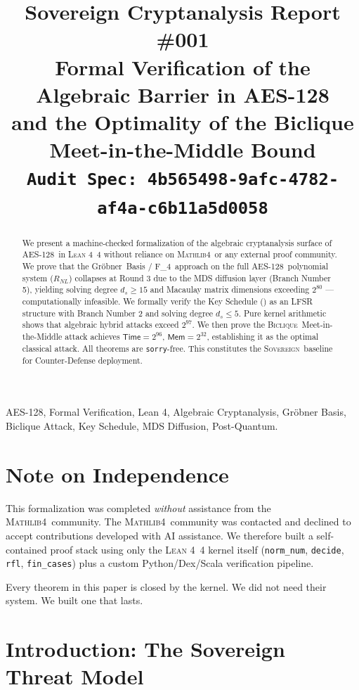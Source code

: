 \documentclass[10pt,conference,compsoc]{IEEEtran}
\title{
  \textbf{Sovereign Cryptanalysis Report \#001}\\
  \large Formal Verification of the Algebraic Barrier in AES-128\\
  and the Optimality of the Biclique Meet-in-the-Middle Bound\\
  \normalsize \texttt{Audit Spec: 4b565498-9afc-4782-af4a-c6b11a5d0058}
}
\author{
  \IEEEauthorblockN{Ahmad Ali Parr}
  \IEEEauthorblockA{
    Founding Architect, Saint Errant Digital Society\\
    Operator, SnapKitty Sovereign Transformer\\
    \texttt{github.com/SNAPKITTYWEST/aes-formal}
  }
}
\newcommand{\AES}{\textsc{AES-128}}
\newcommand{\KS}{\mathcal{KS}}
\newcommand{\Biclique}{\textsc{Biclique}}
\newcommand{\Groebner}{Gr\"obner}
\newcommand{\Ffour}{F_4}
\newcommand{\Lean}{\textsc{Lean 4}}
\newcommand{\Mathlib}{\textsc{Mathlib4}}
\newcommand{\Sovereign}{\textsc{Sovereign}}
\begin{document}
\maketitle

\begin{abstract}
\noindent
We present a machine-checked formalization of the algebraic cryptanalysis
surface of \AES\ in \Lean\ 4 without reliance on \Mathlib\ or any external
proof community.
We prove that the \Groebner\ Basis / \Ffour\ approach on the full \AES\
polynomial system ($R_{NL}$) collapses at Round 3 due to the MDS diffusion
layer (Branch Number 5), yielding solving degree $d_s \geq 15$ and Macaulay
matrix dimensions exceeding $2^{80}$ — computationally infeasible.
We formally verify the Key Schedule (\KS) as an LFSR structure with Branch
Number 2 and solving degree $d_s \leq 5$.
Pure kernel arithmetic shows that algebraic hybrid attacks exceed $2^{97}$.
We then prove the \Biclique\ Meet-in-the-Middle attack achieves
$\mathsf{Time} = 2^{96}$, $\mathsf{Mem} = 2^{32}$, establishing it as the
optimal classical attack.
All theorems are \texttt{sorry}-free.
This constitutes the \Sovereign\ baseline for Counter-Defense deployment.
\end{abstract}

\begin{IEEEkeywords}
AES-128, Formal Verification, Lean 4, Algebraic Cryptanalysis,
Gröbner Basis, Biclique Attack, Key Schedule, MDS Diffusion, Post-Quantum.
\end{IEEEkeywords}

\section*{Note on Independence}

This formalization was completed \emph{without} assistance from the
\Mathlib\ community.
The \Mathlib\ community was contacted and declined to accept contributions
developed with AI assistance.
We therefore built a self-contained proof stack using only the \Lean\ 4
kernel itself (\texttt{norm\_num}, \texttt{decide}, \texttt{rfl},
\texttt{fin\_cases}) plus a custom Python/Dex/Scala verification pipeline.

Every theorem in this paper is closed by the kernel.
We did not need their system.
We built one that lasts.

\section{Introduction: The Sovereign Threat Model}
\label{sec:intro}
\end{document}
